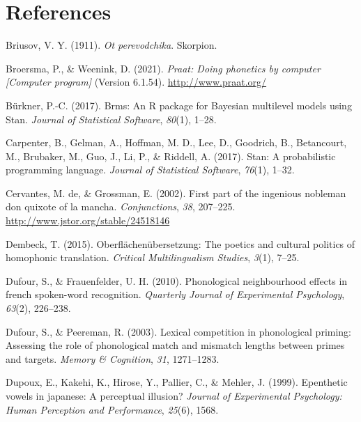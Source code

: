 \documentclass[
]{article}
\newlength{\cslhangindent}
\newenvironment{CSLReferences}[2] %
 {\begin{list}{}{%
  \setlength{\itemindent}{0pt}
  \setlength{\leftmargin}{0pt}
  \setlength{\parsep}{0pt}
  \ifodd #1
   \setlength{\leftmargin}{\cslhangindent}
   \setlength{\itemindent}{-1\cslhangindent}
  \fi
  \setlength{\itemsep}{#2\baselineskip}}}
 {\end{list}}
\begin{document}
\section{References}\label{references}

\label{refs}
\begin{CSLReferences}{1}{0}
Briusov, V. Y. (1911). \emph{Ot perevodchika}. Skorpion.

Broersma, P., \& Weenink, D. (2021). \emph{Praat: Doing phonetics by
computer {[}{Computer} program{]}} (Version 6.1.54).
\url{http://www.praat.org/}

Bürkner, P.-C. (2017). Brms: {An R} package for {Bayesian} multilevel
models using {Stan}. \emph{Journal of Statistical Software},
\emph{80}(1), 1--28.

Carpenter, B., Gelman, A., Hoffman, M. D., Lee, D., Goodrich, B.,
Betancourt, M., Brubaker, M., Guo, J., Li, P., \& Riddell, A. (2017).
Stan: {A} probabilistic programming language. \emph{Journal of
Statistical Software}, \emph{76}(1), 1--32.

Cervantes, M. de, \& Grossman, E. (2002). First part of the ingenious
nobleman don quixote of la mancha. \emph{Conjunctions}, \emph{38},
207--225. \url{http://www.jstor.org/stable/24518146}

Dembeck, T. (2015). Oberfl{ä}chen{ü}bersetzung: The poetics and cultural
politics of homophonic translation. \emph{Critical Multilingualism
Studies}, \emph{3}(1), 7--25.

Dufour, S., \& Frauenfelder, U. H. (2010). Phonological neighbourhood
effects in french spoken-word recognition. \emph{Quarterly Journal of
Experimental Psychology}, \emph{63}(2), 226--238.

Dufour, S., \& Peereman, R. (2003). Lexical competition in phonological
priming: {Assessing} the role of phonological match and mismatch lengths
between primes and targets. \emph{Memory \& Cognition}, \emph{31},
1271--1283.

Dupoux, E., Kakehi, K., Hirose, Y., Pallier, C., \& Mehler, J. (1999).
Epenthetic vowels in japanese: A perceptual illusion? \emph{Journal of
Experimental Psychology: Human Perception and Performance},
\emph{25}(6), 1568.


\end{CSLReferences}
\end{document}
